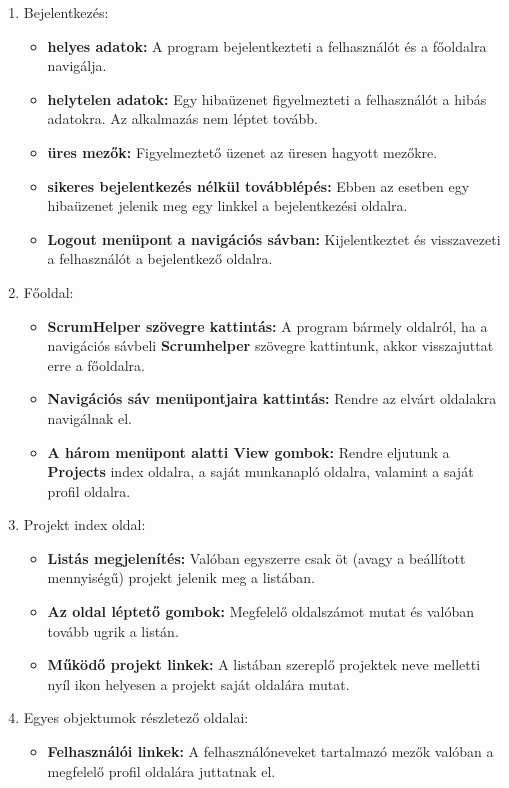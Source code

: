 \begin{enumerate}
	\item Bejelentkezés: 
	\begin{itemize}
		\item \textbf{helyes adatok:} A program bejelentkezteti a felhasználót és a főoldalra navigálja.
		\item \textbf{helytelen adatok:} Egy hibaüzenet figyelmezteti a felhasználót a hibás adatokra. Az alkalmazás nem léptet tovább.
		\item \textbf{üres mezők:} Figyelmeztető üzenet az üresen hagyott mezőkre.
		\item \textbf{sikeres bejelentkezés nélkül továbblépés:} Ebben az esetben egy hibaüzenet jelenik meg egy linkkel a bejelentkezési oldalra.
		\item \textbf{Logout menüpont a navigációs sávban:} Kijelentkeztet és visszavezeti a felhasználót a bejelentkező oldalra.
	\end{itemize}
	\item Főoldal:
	\begin{itemize}
		\item \textbf{ScrumHelper szövegre kattintás:} A program bármely oldalról, ha a navigációs sávbeli \textbf{Scrumhelper} szövegre kattintunk, akkor visszajuttat erre a főoldalra.
		\item \textbf{Navigációs sáv menüpontjaira kattintás:} Rendre az elvárt oldalakra navigálnak el.
		\item \textbf{A három menüpont alatti View gombok:} Rendre eljutunk a \textbf{Projects} index oldalra, a saját munkanapló oldalra, valamint a saját profil oldalra.
	\end{itemize}
	\item Projekt index oldal:
	\begin{itemize}
		\item \textbf{Listás megjelenítés:} Valóban egyszerre csak öt (avagy a beállított mennyiségű) projekt jelenik meg a listában.
		\item \textbf{Az oldal léptető gombok:} Megfelelő oldalszámot mutat és valóban tovább ugrik a listán.
		\item \textbf{Működő projekt linkek:} A listában szereplő projektek neve melletti nyíl ikon helyesen a projekt saját oldalára mutat.
	\end{itemize}
	\item Egyes objektumok részletező oldalai:
	\begin{itemize}
		\item \textbf{Felhasználói linkek:} A felhasználóneveket tartalmazó mezők valóban a megfelelő profil oldalára juttatnak el.

\end{itemize}
\end{enumerate}
